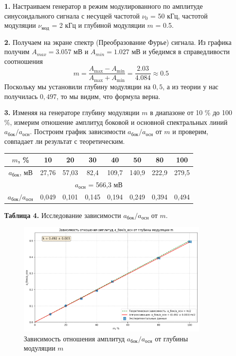 \documentclass[a4paper,12pt]{article}
\begin{document}
\begin{enumerate}
\item [\textbf{1.}] Настраиваем генератор в режим модулированного по амплитуде синусоидального сигнала с несущей частотой $\nu_0$ = 50 кГц, частотой модуляции $\nu_\text{мод}$ = 2 кГц и глубиной модуляции $m$ = 0.5.

\item [\textbf{2.}] Получаем на экране спектр (Преобразование Фурье) сигнала. Из графика получим $A_{max} = 3.057$ мВ и $A_{min} = 1.027$ мВ и убедимся в справедливости соотношения 
\[
m = \frac{A_\text{max} - A_\text{min}}{A_\text{max} + A_\text{min}} = \frac{2.03}{4.084} \approx 0.5
\]
Поскольку мы установили глубину модуляции на $0,5$, а из теории у нас получилась $0,497$, то мы видим, что формула верна.

\item [\textbf{3.}] Изменяя на генераторе глубину модуляции $m$ в диапазоне от 10 \% до 100 \%, измерим отношение амплитуд боковой и основной спектральных линий $a_{\text{бок}}/a_{\text{осн}}$. Построим график зависимости $a_{\text{бок}}/a_{\text{осн}}$ от $m$ и проверим, совпадает ли результат с теоретическим.

\begin{center}
\begin{tabular}{|c|c|c|c|c|c|c|c|}
\hline
$m$, \% & 10 & 20 & 30 & 40 & 50 & 80 & 100 \\ \hline
$a_{\text{бок}}$, мВ & 27,76 & 57,03 & 82,4 & 109,7 & 140,9 & 222,9 & 279,5 \\ \hline
\multicolumn{8}{|c|}{$a_{\text{осн}}$ = 566,3 мВ} \\ \hline
$a_{\text{бок}}/a_{\text{осн}}$ & 0,049 & 0,101 & 0,145 & 0,194 & 0,249 & 0,394 & 0,494 \\ \hline
\end{tabular}

\textbf{Таблица 4.} Исследование зависимости $a_{\text{бок}}/a_{\text{осн}}$ от $m$.
\end{center}

\begin{figure}[h!]
    \centering
    \includegraphics[width=0.9\textwidth]{график 3.png}
    \caption{Зависимость отношения амплитуд $a_{\text{бок}}/a_{\text{осн}}$ от глубины модуляции $m$}
    \label{grafic3}
\end{figure}


\end{enumerate}
\end{document}
